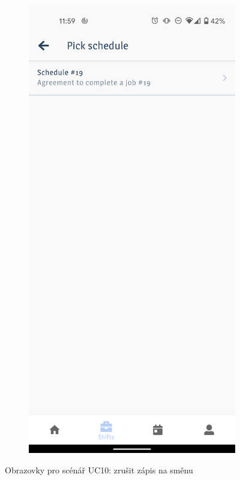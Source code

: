 \documentclass[twoside]{ctuthesis}
\begin{document}
\begin{figure}[ht]
	\begin{subfigure}[h!]{.5\textwidth}
		\centering
		\includegraphics[width=.9\linewidth]{img/uc9b.png}
		\label{uc10b}
	\end{subfigure}
	\caption{Obrazovky pro scénář UC10: zrušit zápis na směnu}
\end{figure}
\end{document}

